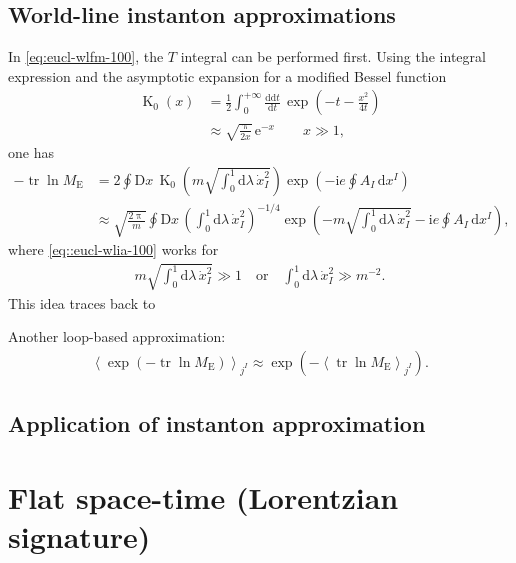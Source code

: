\documentclass[12pt]{article}
\newcommand\mi{\mathrm{i}} %
\newcommand\me{\mathrm{e}} %
\newcommand\pp{\uppi}
\newcommand\dif{\mathrm{d}}
\newcommand\Dif{\mathrm{D}}
\DeclareMathOperator{\BesselK}{K}
\DeclareMathOperator{\tr}{tr}
\newcommand{\rbr}[1]{{\left(#1\right)}}
\newcommand{\abr}[1]{{\left<#1\right>}}
\newcommand{\rfun}[2]{{#1}\mathopen{}\left(#2\right)\mathclose{}}
\newcommand{\frde}[2]{{\frac{\dif{#1}}{\dif{#2}}}}
\begin{document}
\subsection{World-line instanton approximations}
\label{ssec:eucl-wlia}

In \cref{eq:eucl-wlfm-100}, the $T$ integral can be performed first. Using the 
integral expression and the asymptotic expansion for a modified Bessel function
\begin{align}
\rfun{\BesselK_0}{x} &= \frac{1}{2} \int_0^{+\infty} \frde{\dif t}{t}\,
	\rfun{\exp}{-t-\frac{x^2}{4t}}
\\
&\approx \sqrt{\frac{\pp}{2x}}\,\me^{-x}\qquad
	x \gg 1,
\end{align}
one has
\begin{align}
- \tr\ln M_\text{E} &= 2 \oint \Dif x\,
	\rfun{\BesselK_0}{m\sqrt{\int_0^1 \dif\lambda\, \dot{x}_I^2}}
		\rfun{\exp}{- \mi e \oint A_I\,\dif x^I}
\\
&\approx \sqrt{\frac{2\pp}{m}} \oint \Dif x\,
	\rbr{\int_0^1 \dif\lambda\, \dot{x}_I^2}^{-1/4}
	\rfun{\exp}{-m\sqrt{\int_0^1 \dif\lambda\, \dot{x}_I^2}
		- \mi e \oint A_I\,\dif x^I},
\label{eq::eucl-wlia-100}
\end{align}
where \cref{eq::eucl-wlia-100} works for
\begin{align}
m \sqrt{\int_0^1 \dif\lambda\, \dot{x}_I^2} \gg 1
\quad\text{or}\quad
\int_0^1 \dif\lambda\, \dot{x}_I^2 \gg m^{-2}.
\end{align}
This idea traces back to \cite{Affleck1982}


Another loop-based approximation:
\begin{align}
\abr{\rfun{\exp}{-\tr\ln M_\text{E}}}_{j^I} \approx
\rfun{\exp}{-\abr{\tr\ln M_\text{E}}_{j^I}}.
\end{align}



\subsection{Application of instanton approximation}


\cite{Dunne2005}




\section{Flat space-time (Lorentzian signature)}
\end{document}
